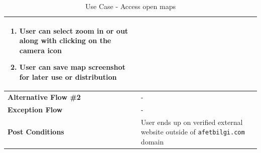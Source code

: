 \begin{table}[H]
\begin{tabular}{|p{.3\linewidth}|p{.7\linewidth}|}
\begin{minipage}[ht]{\linewidth}
\begin{enumerate}[label=\textbf{Step \arabic*:},leftmargin=1.5\leftmargin]
                \item User can select zoom in or out along with clicking on the camera icon
                \item User can save map screenshot for later use or distribution
            \end{enumerate}
        \end{minipage} \\
    \hline
    \textbf{Alternative Flow \#2} & - \\
    \hline
    \textbf{Exception Flow} & - \\
    \hline
    \textbf{Post Conditions} & User ends up on verified external website outside of \texttt{afetbilgi.com} domain \\
    \hline
  \end{tabular}
  \caption{Use Case - Access open maps}
\end{table}

